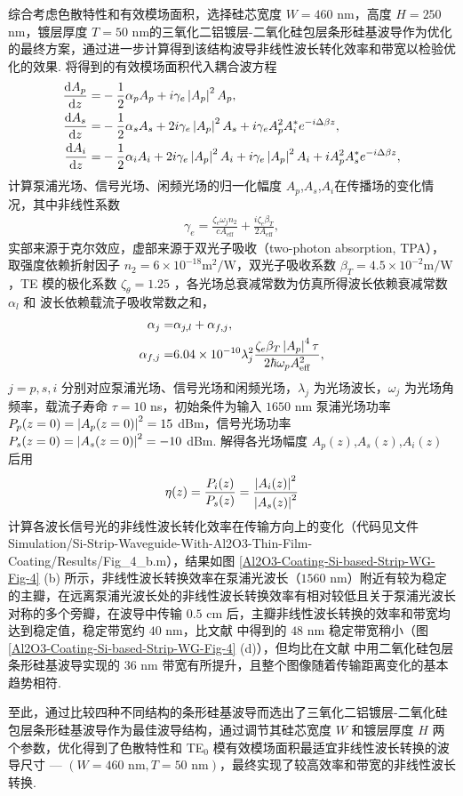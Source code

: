 \documentclass[zh]{assignment}
\begin{document}
综合考虑色散特性和有效模场面积，选择硅芯宽度 $W=460$ nm，高度 $H=250$ nm，镀层厚度 $T=50$ nm的三氧化二铝镀层-二氧化硅包层条形硅基波导作为优化的最终方案，通过进一步计算得到该结构波导非线性波长转化效率和带宽以检验优化的效果. 将得到的有效模场面积代入耦合波方程 \cite{guo2017full}
\begin{align}
    \frac{\mathrm{d}A_p}{\mathrm{d}z}=&-\frac{1}{2}\alpha_pA_p+i\gamma_e\left\lvert A_p\right\rvert^2A_p,\\
    \frac{\mathrm{d}A_s}{\mathrm{d}z}=&-\frac{1}{2}\alpha_sA_s+2i\gamma_e\left\lvert A_p\right\rvert^2A_s+i\gamma_eA_p^2A_i^*e^{-i\Delta\beta z},\\
    \frac{\mathrm{d}A_i}{\mathrm{d}z}=&-\frac{1}{2}\alpha_iA_i+2i\gamma_e\left\lvert A_p\right\rvert^2A_i+i\gamma_e\left\lvert A_p\right\rvert^2A_i+iA_p^2A_s^*e^{-i\Delta\beta z},
\end{align}
计算泵浦光场、信号光场、闲频光场的归一化幅度 $A_p$,$A_s$,$A_i$在传播场的变化情况，其中非线性系数
\begin{align}
    \gamma_e=\frac{\zeta_e\omega_jn_2}{cA_{\text{eff}}}+\frac{i\zeta_e\beta_T}{2A_{\text{eff}}},
\end{align}
实部来源于克尔效应，虚部来源于双光子吸收（two-photon absorption, TPA），取强度依赖折射因子 $n_2=6\times 10^{-18}\text{m}^2/\text{W}$，双光子吸收系数 $\beta_T=4.5\times 10^{-2}\text{m}/\text{W}$，TE 模的极化系数 $\zeta_{\theta}=1.25$ \cite{tsang2002optical}\cite{moss1989dispersion}，各光场总衰减常数为仿真所得波长依赖衰减常数 $\alpha_l$ 和 波长依赖载流子吸收常数之和，
\begin{align}
    \alpha_j=&\alpha_{j,l}+\alpha_{f,j},\\
    \alpha_{f,j}=&6.04\times 10^{-10}\lambda_j^2\frac{\zeta_e\beta_T\left\lvert A_p\right\rvert^4\tau}{2\hbar\omega_pA_{\text{eff}}^2},
\end{align}
$j=p,s,i$ 分别对应泵浦光场、信号光场和闲频光场，$\lambda_j$ 为光场波长，$\omega_j$ 为光场角频率，载流子寿命 $\tau=10$ ns，初始条件为输入 $1650$ nm 泵浦光场功率 $P_p(z=0)=\left\lvert A_p(z=0)\right\rvert^2=15$ dBm，信号光场功率 $P_s(z=0)=\left\lvert A_s(z=0)\right\rvert^2=-10$ dBm. 解得各光场幅度 $A_p(z)$,$A_s(z)$,$A_i(z)$ 后用
\begin{align}
    \eta(z)=\frac{P_i(z)}{P_s(z)}=\frac{\left\lvert A_i(z)\right\rvert^2}{\left\lvert A_s(z)\right\rvert^2}
\end{align}
计算各波长信号光的非线性波长转化效率在传输方向上的变化（代码见文件 Simulation/Si-Strip-Waveguide-With-Al2O3-Thin-Film-Coating/Results/Fig\_4\_b.m），结果如图 \ref{Al2O3-Coating-Si-based-Strip-WG-Fig-4} (b) 所示，非线性波长转换效率在泵浦光波长（$1560$ nm）附近有较为稳定的主瓣，在远离泵浦光波长处的非线性波长转换效率有相对较低且关于泵浦光波长对称的多个旁瓣，在波导中传输 $0.5$ cm 后，主瓣非线性波长转换的效率和带宽均达到稳定值，稳定带宽约 $40$ nm，比文献 \cite{guo2018experimentally} 中得到的 $48$ nm 稳定带宽稍小（图 \ref{Al2O3-Coating-Si-based-Strip-WG-Fig-4} (d)），但均比在文献 \cite{guo2017full} 中用二氧化硅包层条形硅基波导实现的 $36$ nm 带宽有所提升，且整个图像随着传输距离变化的基本趋势相符.

至此，通过比较四种不同结构的条形硅基波导而选出了三氧化二铝镀层-二氧化硅包层条形硅基波导作为最佳波导结构，通过调节其硅芯宽度 $W$ 和镀层厚度 $H$ 两个参数，优化得到了色散特性和 TE$_0$ 模有效模场面积最适宜非线性波长转换的波导尺寸 --- $(W=460\text{ nm},T=50\text{ nm})$，最终实现了较高效率和带宽的非线性波长转换.

\appendix


\end{document}
